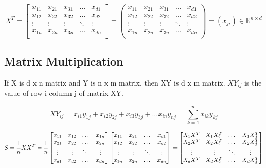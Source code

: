 \documentclass{article}
\begin{document}
$$
X^T = 
\begin{bmatrix}
  x_{11} & x_{21} & x_{31} & \dots & x_{d1} \\
  x_{12} & x_{22} & x_{32} & \dots & x_{d2} \\
  \vdots & \vdots & \vdots & \ddots & \vdots \\
  x_{1n} & x_{2n} & x_{3n} & \dots & x_{dn} \\
\end{bmatrix}
=
\begin{pmatrix}
  x_{11} & x_{21} & x_{31} & \dots & x_{d1} \\
  x_{12} & x_{22} & x_{32} & \dots & x_{d2} \\
  \vdots & \vdots & \vdots & \ddots & \vdots \\
  x_{1n} & x_{2n} & x_{3n} & \dots & x_{dn} \\
\end{pmatrix}
= (x_{ji}) \in \mathbb{R}^{n \times d}
$$

\newpage

\subsection{Matrix Multiplication}
If X is d x n matrix and Y is n x m matrix, then XY is d x m matrix. $XY_{ij}$ is the value of row i column j of matrix XY.

$$XY_{ij} = x_{i1}y_{1j} + x_{i2}y_{2j} + x_{i3}y_{3j} + \dots x_{in}y_{nj} = \sum_{k=1}^{n}x_{ik}y_{kj}$$

$$
S = 
\frac{1}{n}XX^T
=\frac{1}{n}
\begin{bmatrix}
  x_{11} & x_{12} & \dots & x_{1n} \\
  x_{21} & x_{22} & \dots & x_{2n} \\
  \vdots & \vdots & \ddots & \vdots \\
  x_{d1} & x_{d2} & \dots & x_{dn} \\
\end{bmatrix}
\begin{bmatrix}
  x_{11} & x_{21} & \dots & x_{d1} \\
  x_{12} & x_{22} & \dots & x_{d2} \\
  \vdots & \vdots & \ddots & \vdots \\
  x_{1n} & x_{2n} & \dots & x_{dn} \\
\end{bmatrix}
\\
=
\begin{bmatrix}
  X_{1}X_{1}^T & X_{1}X_{2}^T & \dots & X_{1}X_{d}^T \\
  X_{2}X_{1}^T & X_{2}X_{2}^T & \dots & X_{2}X_{d}^T \\  
  \vdots & \vdots  & \ddots & \vdots \\
  X_{d}X_{1}^T & X_{d}X_{2}^T & \dots & X_{d}X_{d}^T \\  
\end{bmatrix}
$$
\end{document}
